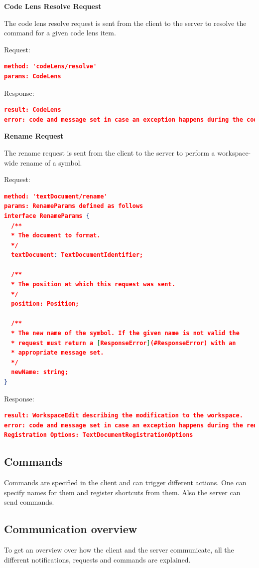 \textbf{Code Lens Resolve Request}

The code lens resolve request is sent from the client to the server to resolve the command for a given code lens item.

Request:
\begin{lstlisting}[language=json,firstnumber=1]
method: 'codeLens/resolve'
params: CodeLens
\end{lstlisting}

Response:
\begin{lstlisting}[language=json,firstnumber=1]
result: CodeLens
error: code and message set in case an exception happens during the code lens resolve request.
\end{lstlisting}

\textbf{Rename Request}

The rename request is sent from the client to the server to perform a workspace-wide rename of a symbol.

Request:
\begin{lstlisting}[language=json,firstnumber=1]
method: 'textDocument/rename'
params: RenameParams defined as follows
interface RenameParams {
  /**
  * The document to format.
  */
  textDocument: TextDocumentIdentifier;

  /**
  * The position at which this request was sent.
  */
  position: Position;

  /**
  * The new name of the symbol. If the given name is not valid the
  * request must return a [ResponseError](#ResponseError) with an
  * appropriate message set.
  */
  newName: string;
}
\end{lstlisting}
Response:
\begin{lstlisting}[language=json,firstnumber=1]
result: WorkspaceEdit describing the modification to the workspace.
error: code and message set in case an exception happens during the rename request.
Registration Options: TextDocumentRegistrationOptions
\end{lstlisting}

\subsection{Commands}
Commands are specified in the client and can trigger different actions. One can specify names for them and register shortcuts from them. Also the server can send commands. 

\subsection{Communication overview}\label{custom commands}
To get an overview over how the client and the server communicate, all the different notifications, requests and commands are explained. 


